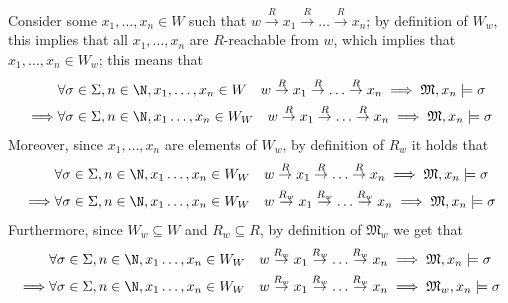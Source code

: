 \documentclass[a4paper, 12pt]{report}
\begin{document}
{{            Consider some $x_1, \ldots, x_n \in W$ such that $w \stackrel{R}{\to} x_1 \stackrel{R}{\to} \ldots \stackrel{R}{\to} x_n$; by definition of $W_w$, this implies that all $x_1, \ldots, x_n$ are $R$-reachable from $w$, which implies that $x_1, \ldots, x_n \in W_w$; this means that
            \begin{equation*}
                \begin{split}
                         & \forall \sigma \in \Sigma, n \in \N, x_1, \ldots, x_n \in W \quad w \stackrel{R}{\to} x_1 \stackrel{R}{\to} \ldots \stackrel{R}{\to} x_n \implies \mathfrak M, x_n \models \sigma \\
                    \implies & \forall \sigma \in \Sigma, n \in \N, x_1 \ldots, x_n \in W_W \quad w \stackrel{R}{\to} x_1 \stackrel{R}{\to} \ldots \stackrel{R}{\to} x_n \implies \mathfrak M, x_n \models \sigma
                \end{split}
            \end{equation*}
            Moreover, since $x_1, \ldots, x_n$ are elements of $W_w$, by definition of $R_w$ it holds that
            \begin{equation*}
                \begin{split}
                    & \forall \sigma \in \Sigma, n \in \N, x_1 \ldots, x_n \in W_W \quad w \stackrel{R}{\to} x_1 \stackrel{R}{\to} \ldots \stackrel{R}{\to} x_n \implies \mathfrak M, x_n \models \sigma \\
                    \implies & \forall \sigma \in \Sigma, n \in \N, x_1 \ldots, x_n \in W_W \quad w \stackrel{R_w}{\to} x_1 \stackrel{R_w}{\to} \ldots \stackrel{R_w}{\to} x_n \implies \mathfrak M, x_n \models \sigma
                \end{split}
            \end{equation*}
            Furthermore, since $W_w \subseteq W$ and $R_w \subseteq R$, by definition of $\mathfrak M_w$ we get that
            \begin{equation*}
                \begin{split}
                    & \forall \sigma \in \Sigma, n \in \N, x_1 \ldots, x_n \in W_W \quad w \stackrel{R_w}{\to} x_1 \stackrel{R_w}{\to} \ldots \stackrel{R_w}{\to} x_n \implies \mathfrak M, x_n \models \sigma \\
                    \implies & \forall \sigma \in \Sigma, n \in \N, x_1 \ldots, x_n \in W_W \quad w \stackrel{R_w}{\to} x_1 \stackrel{R_w}{\to} \ldots \stackrel{R_w}{\to} x_n \implies \mathfrak M_w, x_n \models \sigma
                \end{split}

\end{equation*}}}
\end{document}
